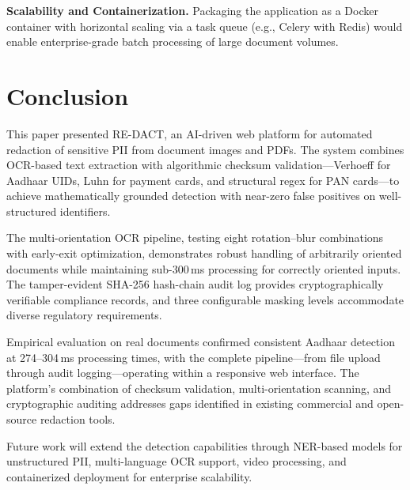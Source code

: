 \documentclass[conference]{IEEEtran}
\begin{document}
\textbf{Scalability and Containerization.} Packaging the application as a Docker container with horizontal scaling via a task queue (e.g., Celery with Redis) would enable enterprise-grade batch processing of large document volumes.


\section{Conclusion}

This paper presented RE-DACT, an AI-driven web platform for automated redaction of sensitive PII from document images and PDFs. The system combines OCR-based text extraction with algorithmic checksum validation---Verhoeff for Aadhaar UIDs, Luhn for payment cards, and structural regex for PAN cards---to achieve mathematically grounded detection with near-zero false positives on well-structured identifiers.

The multi-orientation OCR pipeline, testing eight rotation--blur combinations with early-exit optimization, demonstrates robust handling of arbitrarily oriented documents while maintaining sub-300\,ms processing for correctly oriented inputs. The tamper-evident SHA-256 hash-chain audit log provides cryptographically verifiable compliance records, and three configurable masking levels accommodate diverse regulatory requirements.

Empirical evaluation on real documents confirmed consistent Aadhaar detection at 274--304\,ms processing times, with the complete pipeline---from file upload through audit logging---operating within a responsive web interface. The platform's combination of checksum validation, multi-orientation scanning, and cryptographic auditing addresses gaps identified in existing commercial and open-source redaction tools.

Future work will extend the detection capabilities through NER-based models for unstructured PII, multi-language OCR support, video processing, and containerized deployment for enterprise scalability.
\end{document}
